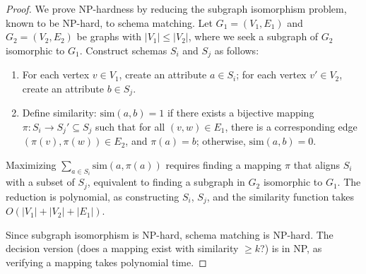 \documentclass[10pt,a4paper]{amsart}
\begin{document}
\begin{proof}
We prove NP-hardness by reducing the subgraph isomorphism problem, known to be NP-hard, to schema matching. Let \( G_1 = (V_1, E_1) \) and \( G_2 = (V_2, E_2) \) be graphs with \( |V_1| \leq |V_2| \), where we seek a subgraph of \( G_2 \) isomorphic to \( G_1 \). Construct schemas \( S_i \) and \( S_j \) as follows:
\begin{enumerate}
    \item For each vertex \( v \in V_1 \), create an attribute \( a \in S_i \); for each vertex \( v' \in V_2 \), create an attribute \( b \in S_j \).
    \item Define similarity: \( \text{sim}(a, b) = 1 \) if there exists a bijective mapping \( \pi: S_i \to S_j' \subseteq S_j \) such that for all \( (v, w) \in E_1 \), there is a corresponding edge \( (\pi(v), \pi(w)) \in E_2 \), and \( \pi(a) = b \); otherwise, \( \text{sim}(a, b) = 0 \).
\end{enumerate}
Maximizing
$
 \sum_{a \in S_i} \text{sim}(a, \pi(a))
$
requires finding a mapping \( \pi \) that aligns \( S_i \) with a subset of \( S_j \), equivalent to finding a subgraph in \( G_2 \) isomorphic to \( G_1 \). The reduction is polynomial, as constructing \( S_i \), \( S_j \), and the similarity function takes   $ O(|V_1| + |V_2| + |E_1|).$

Since subgraph isomorphism is NP-hard, schema matching is NP-hard. The decision version (does a mapping exist with similarity \( \geq k \)?) is in NP, as verifying a mapping takes polynomial time.
\end{proof}
\end{document}
